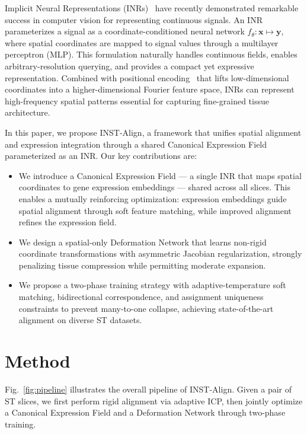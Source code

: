 \documentclass[runningheads]{llncs}
\begin{document}
Implicit Neural Representations (INRs)~\cite{ref_nerf,ref_siren} have recently demonstrated remarkable success in computer vision for representing continuous signals. An INR parameterizes a signal as a coordinate-conditioned neural network $f_\theta: \mathbf{x} \mapsto \mathbf{y}$, where spatial coordinates are mapped to signal values through a multilayer perceptron (MLP). This formulation naturally handles continuous fields, enables arbitrary-resolution querying, and provides a compact yet expressive representation. Combined with positional encoding~\cite{ref_nerf} that lifts low-dimensional coordinates into a higher-dimensional Fourier feature space, INRs can represent high-frequency spatial patterns essential for capturing fine-grained tissue architecture.

In this paper, we propose INST-Align, a framework that unifies spatial alignment and expression integration through a shared Canonical Expression Field parameterized as an INR. Our key contributions are:
\begin{itemize}
\item We introduce a Canonical Expression Field --- a single INR that maps spatial coordinates to gene expression embeddings --- shared across all slices. This enables a mutually reinforcing optimization: expression embeddings guide spatial alignment through soft feature matching, while improved alignment refines the expression field.
\item We design a spatial-only Deformation Network that learns non-rigid coordinate transformations with asymmetric Jacobian regularization, strongly penalizing tissue compression while permitting moderate expansion.
\item We propose a two-phase training strategy with adaptive-temperature soft matching, bidirectional correspondence, and assignment uniqueness constraints to prevent many-to-one collapse, achieving state-of-the-art alignment on diverse ST datasets.
\end{itemize}


\section{Method}

Fig.~\ref{fig:pipeline} illustrates the overall pipeline of INST-Align. Given a pair of ST slices, we first perform rigid alignment via adaptive ICP, then jointly optimize a Canonical Expression Field and a Deformation Network through two-phase training.
\end{document}
